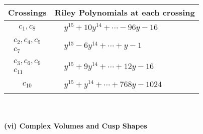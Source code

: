 \documentclass[1p]{elsarticle_modified}
\theoremstyle{definition}
\begin{document}
\begin{tabular}{m{50pt}|m{274pt}}
Crossings & \hspace{64pt}Riley Polynomials at each crossing \\
\hline $$\begin{aligned}c_{1},c_{8}\end{aligned}$$&$\begin{aligned}
&y^{15}+10 y^{14}+\cdots-96 y-16
\end{aligned}$\\
\hline $$\begin{aligned}c_{2},c_{4},c_{5}\\c_{7}\end{aligned}$$&$\begin{aligned}
&y^{15}-6 y^{14}+\cdots+y-1
\end{aligned}$\\
\hline $$\begin{aligned}c_{3},c_{6},c_{9}\\c_{11}\end{aligned}$$&$\begin{aligned}
&y^{15}+9 y^{14}+\cdots+12 y-16
\end{aligned}$\\
\hline $$\begin{aligned}c_{10}\end{aligned}$$&$\begin{aligned}
&y^{15}+y^{14}+\cdots+768 y-1024
\end{aligned}$\\
\hline
\end{tabular}\\~\\
\newpage\flushleft \textbf{(vi) Complex Volumes and Cusp Shapes}
\end{document}
